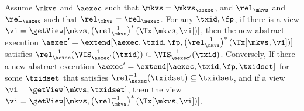 \begin{theorem}
    \label{thm:view-vis-relation}
    Assume \( \mkvs \) and \( \aexec \) such that \( \mkvs = \mkvs_\aexec \), 
    and \( \rel_\mkvs \) and \( \rel_\aexec \) such that \( \rel_\mkvs = \rel_\aexec \).
    For any \(\txid, \fp \),
    if there is a view \( \vi = \getView[\mkvs,\left(\rel_\mkvs^{-1}\right)^{*}(\Tx[\mkvs,\vi])] \),
    then the new abstract execution \( \aexec' = \extend[\aexec, \txid, \fp, \left(\rel_\mkvs^{-1}\right)^{*}(\Tx[\mkvs,\vi])] \)
    satisfies \( \rel_\aexec^{-1}(\VIS_{\aexec'}^{-1}(\txid)) \subseteq \VIS_{\aexec'}^{-1}(\txid) \).
    Conversely,
    If there a new abstract execution \( \aexec' = \extend[\aexec, \txid, \fp, \txidset] \) for some \( \txidset \)
    that satisfies \( \rel_\aexec^{-1}(\txidset) \subseteq \txidset \),
    and if a view \( \vi = \getView[\mkvs,\txidset] \),
    then the view \( \vi = \getView[\mkvs,\left(\rel_\mkvs^{-1}\right)^{*}(\Tx[\mkvs,\vi])] \).
\end{theorem}
